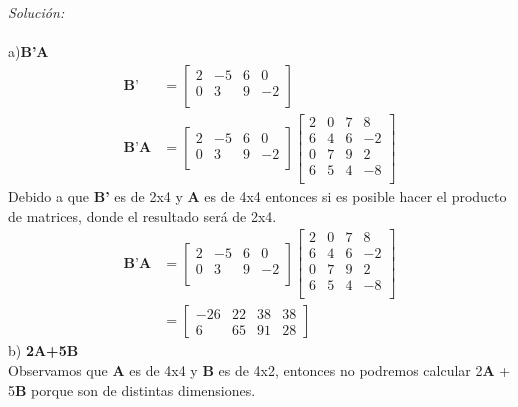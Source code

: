 \documentclass[12pt]{article}
\newenvironment{sol}
    {\emph{Solución:}
    }
    {
    }
\begin{document}
\begin{sol}\\ \\
a)\textbf{B'A} \\

\begin{align*}
\textbf{B'} &=
	\begin{bmatrix}
		2 & -5 & 6 & 0 \\
		0 & 3 & 9 & -2 \\
	\end{bmatrix}	 \\
\textbf{B'A} &= 
 	\begin{bmatrix}
		2 & -5 & 6 & 0 \\
		0 & 3 & 9 & -2 \\
	\end{bmatrix}
	\begin{bmatrix}
		2 & 0 & 7 & 8\\
		6 & 4 & 6 & -2 \\
		0 & 7 & 9 & 2 \\
		6 & 5 & 4 & -8\\
	\end{bmatrix}
\end{align*}
Debido a que \textbf{B'} es de 2x4 y \textbf{A} es de 4x4 entonces si es posible hacer el producto de matrices, donde el resultado será de 2x4.
\begin{align*}
\textbf{B'A} &= 
 	\begin{bmatrix}
		2 & -5 & 6 & 0 \\
		0 & 3 & 9 & -2 \\
	\end{bmatrix}
	\begin{bmatrix}
		2 & 0 & 7 & 8\\
		6 & 4 & 6 & -2 \\
		0 & 7 & 9 & 2 \\
		6 & 5 & 4 & -8\\
	\end{bmatrix}\\
	&=
	\begin{bmatrix}
		-26 & 22 & 38 & 38 \\
		6 & 65 & 91 & 28
	\end{bmatrix}
\end{align*}
b) \textbf{2A+5B}\\
Observamos que \textbf{A} es de 4x4 y \textbf{B} es de 4x2, entonces no podremos calcular 2\textbf{A} + 5\textbf{B} porque son de distintas dimensiones.\\ \\

\end{sol}
\end{document}
